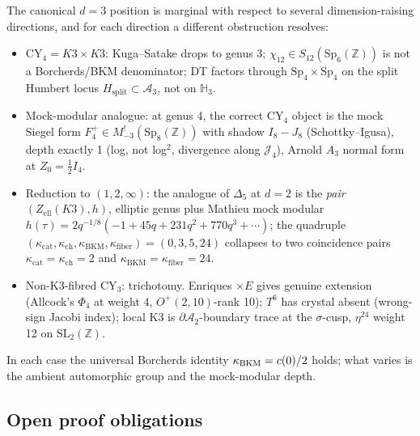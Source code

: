 The canonical $d = 3$ position is marginal with respect to
several dimension-raising directions, and for each direction a different
obstruction resolves:
\begin{itemize}
\item $\mathrm{CY}_4 = K3 \times K3$: Kuga--Satake drops to genus 3;
$\chi_{12} \in S_{12}(\mathrm{Sp}_6(\mathbb{Z}))$ is not a Borcherds/BKM denominator;
DT factors through $\mathrm{Sp}_4 \times \mathrm{Sp}_4$ on the split Humbert locus $H_{\mathrm{split}} \subset \mathcal{A}_3$, not on $\mathbb{H}_3$.
\item Mock-modular analogue: at genus 4, the correct CY$_4$ object is the mock Siegel form $F_4^+ \in M^!_{-3}(\mathrm{Sp}_8(\mathbb{Z}))$ with shadow $I_8 - J_8$ (Schottky--Igusa), depth exactly 1 (log, not log$^2$, divergence along $\mathcal{J}_4$), Arnold $A_3$ normal form at $Z_0 = \tfrac{1}{2}I_4$.
\item Reduction to $(1, 2, \infty)$: the analogue of $\Delta_5$ at $d = 2$ is the \emph{pair} $(Z_{\mathrm{ell}}(K3), h)$, elliptic genus plus Mathieu mock modular $h(\tau) = 2q^{-1/8}(-1 + 45q + 231q^2 + 770q^3 + \cdots)$; the quadruple $(\kappa_{\mathrm{cat}}, \kappa_{\mathrm{ch}}, \kappa_{\mathrm{BKM}}, \kappa_{\mathrm{fiber}}) = (0, 3, 5, 24)$ collapses to two coincidence pairs $\kappa_{\mathrm{cat}} = \kappa_{\mathrm{ch}} = 2$ and $\kappa_{\mathrm{BKM}} = \kappa_{\mathrm{fiber}} = 24$.
\item Non-K3-fibred CY$_3$: trichotomy.  Enriques $\times E$ gives genuine extension (Allcock's $\Phi_4$ at weight 4, $O^+(2, 10)$-rank 10); $T^6$ has crystal absent (wrong-sign Jacobi index); local K3 is $\partial \mathcal{A}_2$-boundary trace at the $\sigma$-cusp, $\eta^{24}$ weight 12 on $\mathrm{SL}_2(\mathbb{Z})$.
\end{itemize}
In each case the universal Borcherds identity $\kappa_{\mathrm{BKM}} = c(0)/2$ holds; what
varies is the ambient automorphic group and the mock-modular depth.

\subsection{Open proof obligations}


